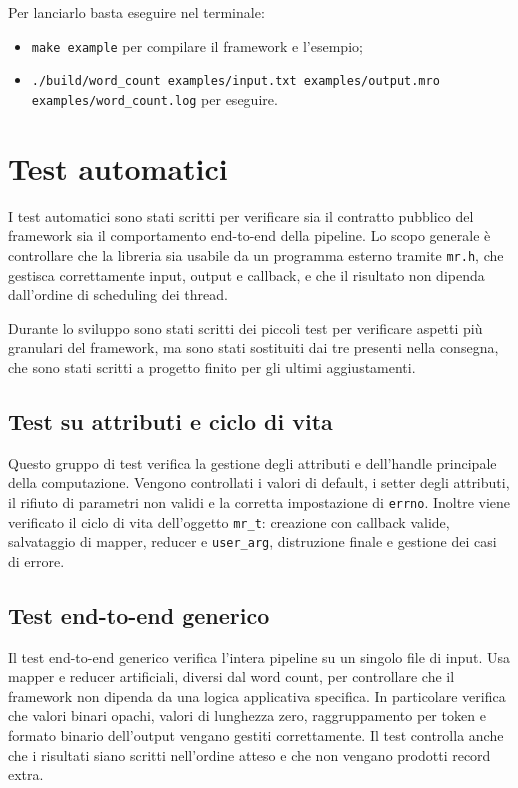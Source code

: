 \documentclass[11pt,a4paper]{article}
\begin{document}
Per lanciarlo basta eseguire nel terminale:

\begin{itemize}
    \item \texttt{make example} per compilare il framework e l'esempio;
    \item \texttt{./build/word\_count examples/input.txt examples/output.mro examples/word\_count.log} per eseguire.
\end{itemize}

\section{Test automatici}

I test automatici sono stati scritti per verificare sia il contratto pubblico del framework sia il comportamento end-to-end della pipeline. Lo scopo generale è controllare che la libreria sia usabile da un programma esterno tramite \texttt{mr.h}, che gestisca correttamente input, output e callback, e che il risultato non dipenda dall'ordine di scheduling dei thread.

Durante lo sviluppo sono stati scritti dei piccoli test per verificare aspetti più granulari del framework, ma sono stati sostituiti dai tre presenti nella consegna, che sono stati scritti a progetto finito per gli ultimi aggiustamenti.

\subsection{Test su attributi e ciclo di vita}

Questo gruppo di test verifica la gestione degli attributi e dell'handle principale della computazione. Vengono controllati i valori di default, i setter degli attributi, il rifiuto di parametri non validi e la corretta impostazione di \texttt{errno}. Inoltre viene verificato il ciclo di vita dell'oggetto \texttt{mr\_t}: creazione con callback valide, salvataggio di mapper, reducer e \texttt{user\_arg}, distruzione finale e gestione dei casi di errore.

\subsection{Test end-to-end generico}

Il test end-to-end generico verifica l'intera pipeline su un singolo file di input. Usa mapper e reducer artificiali, diversi dal word count, per controllare che il framework non dipenda da una logica applicativa specifica. In particolare verifica che valori binari opachi, valori di lunghezza zero, raggruppamento per token e formato binario dell'output vengano gestiti correttamente. Il test controlla anche che i risultati siano scritti nell'ordine atteso e che non vengano prodotti record extra.
\end{document}
